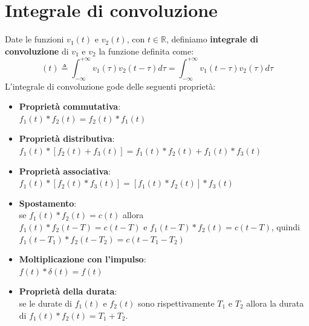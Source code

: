 \documentclass[a4paper, titlepage, oneside]{scrbook}
\begin{document}
\section{Integrale di convoluzione}
Date le funzioni $v_1(t)$ e $v_2(t)$, con $t\in \mathbb{R}$, definiamo \textbf{integrale di convoluzione} di $v_1$ e $v_2$ la funzione definita come:
\begin{equation*}
	[v_1 * v_2](t) \triangleq \int_{-\infty}^{+\infty}v_1(\tau)v_2(t - \tau) d\tau = \int_{-\infty}^{+\infty}v_1(t - \tau)v_2(\tau) d\tau
\end{equation*}
L'integrale di convoluzione gode delle seguenti proprietà:
\begin{itemize}
	\item \textbf{Proprietà commutativa}:\\
	$f_1(t)*f_2(t) = f_2(t) * f_1(t)$
	\item \textbf{Proprietà distributiva}:\\
	$f_1(t)*[f_2(t)+f_3(t)]=f_1(t)*f_2(t)+f_1(t)*f_3(t)$
	\item \textbf{Proprietà associativa}:\\
	$f_1(t)*[f_2(t)*f_3(t)]=[f_1(t)*f_2(t)]*f_3(t)$
	\item \textbf{Spostamento}:\\
	se $f_1(t)*f_2(t)=c(t)$ allora\\
	$f_1(t)*f_2(t-T)=c(t-T)$ e $f_1(t-T)*f_2(t)=c(t-T)$, quindi\\
	$f_1(t-T_1)*f_2(t-T_2)=c(t-T_1-T_2)$
	\item \textbf{Moltiplicazione con l'impulso}:\\
	$f(t)*\delta(t)=f(t)$
	\item \textbf{Proprietà della durata}:\\
	se le durate di $f_1(t)$ e $f_2(t)$ sono rispettivamente $T_1$ e $T_2$
	allora la durata di $f_1(t)*f_2(t)=T_1+T_2$.
\end{itemize}
\end{document}
